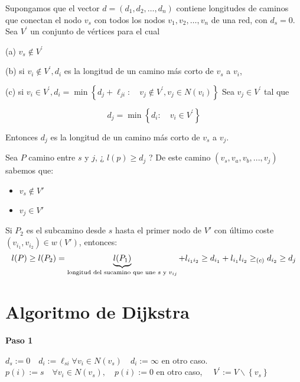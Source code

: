 \documentclass[openany]{book}
\begin{document}
\begin{theorem}
  Supongamos que el vector $d=\left(d_{1}, d_{2}, \ldots, d_{n}\right)$ contiene longitudes de caminos que conectan el nodo $v_{s}$ con todos los nodos $v_{1}, v_{2}, \ldots, v_{n}$ de una red, con $d_{s}=0$. Sea $V^{\prime}$ un conjunto de vértices para el cual

  (a) $v_{s} \notin V^{\prime}$

  (b) si $v_{i} \notin V^{\prime}, d_{i}$ es la longitud de un camino más corto de $v_{s}$ a $v_{i}$,

  (c) si $v_{i} \in V^{\prime}, d_{i}=\min \left\{d_{j}+\ell_{j i}: \quad v_{j} \notin V^{\prime}, v_{j} \in N\left(v_{i}\right)\right\}$ Sea $v_{j} \in V^{\prime}$ tal que

  $$
  d_{j}=\min \left\{d_{i}: \quad v_{i} \in V^{\prime}\right\}
  $$

  Entonces $d_{j}$ es la longitud de un camino más corto de $v_{s}$ a $v_{j}$.
\end{theorem}

\begin{demonstration}
    Sea $ P $ camino entre $ s $ y $ j  $, ¿ $ l(p)\geq d_j $ ? De este camino $ (v_{s},v_{a},v_{b},...,v_{j}) $ sabemos que:
    \begin{itemize}
        \item $ v_{s} \not \in V' $
        \item $ v_j \in V' $
    \end{itemize}
    Si $ P_{2} $ es el subcamino desde $ s $ hasta el primer nodo de $ V' $ con último coste $ (v_{i_1},v_{i_2}) \in w(V') $, entonces:
    $$ l(P) \geq l(P_2) =\underbrace{l(P_1)}_{\text{longitud del sucamino que une $ s $ y $ v_{ij} $}}+l_{i_1i_2} \geq d_{i_1} + l_{i_1}l_{i_2} \geq _{(c)} d_{i_2} \geq d_j$$
\end{demonstration}


\section{Algoritmo de Dijkstra}

\begin{center}
\textbf{Paso 1}
\end{center}


$d_{s}:=0 \quad d_{i}:=\ell_{s i} \forall v_{i} \in N\left(v_{s}\right) \quad d_{i}:=\infty$ en otro caso. $p(i):=s \quad \forall v_{i} \in N\left(v_{s}\right), \quad p(i):=0$ en otro caso, $\quad V^{\prime}:=V \backslash\left\{v_{s}\right\}$
\end{document}
